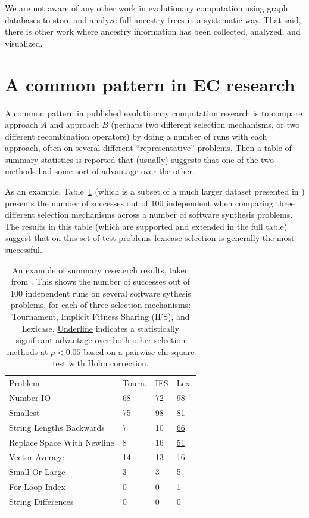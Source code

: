 We are not aware of any other work in evolutionary computation using graph
databases to store and analyze full ancestry trees in a systematic way. That
said, there is other work where ancestry information has been collected,
analyzed, and visualized.


\section{A common pattern in EC research}
\label{sec:EC_pattern}

A common pattern in published evolutionary computation research is to
compare approach $A$ and approach $B$ (perhaps two different selection
mechanisms, or two different recombination operators) by doing a number
of runs with each approach, often on several different ``representative''
problems. Then a table of summary statistics is reported that (usually)
suggests that one of the two methods had some sort of advantage over
the other.

As an example, Table~\ref{tab:example_table} (which is a subset of a 
much larger dataset presented in \cite{Helmuth:Benchmarks}) presents
the number of successes out of 100 independent when comparing three
different selection mechanisms across a number of software synthesis
problems. The results in this table (which are supported and extended
in the full table) suggest that on this set of test problems lexicase
selection is generally the most successful.

\begin{table}
	\caption{An example of summary reseaerch results, taken from
	\cite{Helmuth:Benchmarks}. This shows the number of successes
    out of 100 independent runs on several software sythesis problems,
    for each of three selection mechanisms: Tournament, Implicit Fitness Sharing (IFS), and Lexicase. \underline{Underline} indicates a statistically
    significant advantage over both other selection methods at $p < 0.05$
    based on a pairwise chi-square test with Holm correction.}
	\label{tab:example_table}       %
	\begin{tabular}{llll}
		\hline\noalign{\smallskip}
		Problem & Tourn. & IFS & Lex. \\
		\noalign{\smallskip}\hline\noalign{\smallskip}
		Number IO & 68 & 72 & \underline{98} \\
		Smallest & 75 & \underline{98} & 81 \\
		String Lengths Backwards & 7 & 10 & \underline{66} \\
		Replace Space With Newline & 8 & 16 & \underline{51} \\
		Vector Average & 14 & 13 & 16 \\
		Small Or Large & 3 & 3 & 5 \\
		For Loop Index & 0 & 0 & 1 \\
		String Differences & 0 & 0 & 0 \\
		\noalign{\smallskip}\hline
	\end{tabular}
\end{table}

